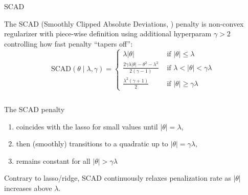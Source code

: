 \documentclass[11pt,compress,t,notes=noshow, xcolor=table]{beamer}
\begin{document}
\begin{vbframe}{SCAD}

The SCAD ({\footnotesize{Smoothly Clipped Absolute Deviations}, }) penalty is non-convex regularizer with piece-wise definition using additional hyperparam $\gamma>2$ controlling how fast penalty ``tapers off'':
{\footnotesize
$$
\text{SCAD}(\theta \mid \lambda, \gamma)= \begin{cases}\lambda|\theta| & \text { if }|\theta| \leq \lambda \\ \frac{2 \gamma \lambda|\theta|-\theta^2-\lambda^2}{2(\gamma-1)} & \text { if } \lambda<|\theta|<\gamma \lambda \\ \frac{\lambda^2(\gamma+1)}{2} & \text { if }|\theta| \geq \gamma \lambda\end{cases}
$$
}

\begin{columns}

\begin{column}{0.4\textwidth}

{\scriptsize
The SCAD penalty 
\begin{enumerate}
    \item coincides with the lasso for small values until $|\theta|=\lambda$,
    \item then (smoothly) transitions to a quadratic up to $|\theta|=\gamma \lambda$,
    \item remains constant for all $|\theta|>\gamma \lambda$
\end{enumerate}

Contrary to lasso/ridge, SCAD continuously relaxes penalization rate as $|\theta|$ increases above $\lambda$. %
}
\end{column}

\begin{column}{0.6\textwidth}


\end{column}
\end{columns}
\end{vbframe}
\end{document}
